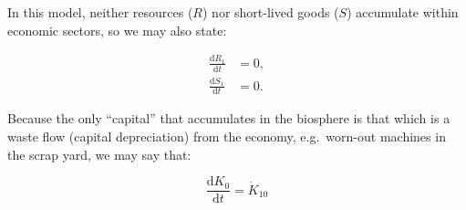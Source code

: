 
In this model, neither resources ($R$) 
nor short-lived goods ($S$) accumulate within economic sectors, so we may also state:

\begin{align}\label{eq:A-dS_1/dt_zero}
	\frac{\mathrm{d}R_1}{\mathrm{d}t}				&
	= 0,																	\\
	\frac{\mathrm{d}S_1}{\mathrm{d}t}				&
	= 0.
\end{align}




Because the only ``capital'' that accumulates 
in the biosphere
is that which is a waste flow 
(capital depreciation)
from the economy,
e.g.\ worn-out machines in the scrap yard,
we may say that:

\begin{equation} \label{eq:A_K0_balance}
	\frac{\mathrm{d}K_{0}}{\mathrm{d}t}		
	= \dot{K}_{10}
\end{equation}


